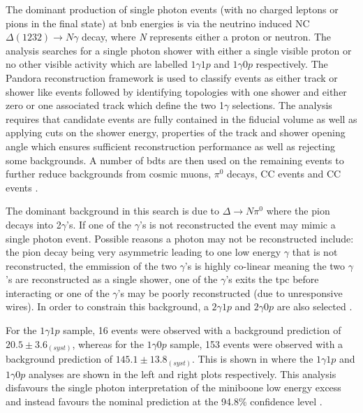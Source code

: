 The dominant production of single photon events (with no charged leptons or pions in the final state) at \gls{bnb} energies is via the neutrino induced NC $\Delta(1232) \rightarrow N\gamma$ decay, where \textit{N} represents either a proton or neutron. The analysis searches for a single photon shower with either a single visible proton or no other visible activity which are labelled $1\gamma1p$ and $1\gamma0p$ respectively. The Pandora reconstruction framework is used to classify events as either track or shower like events followed by identifying topologies with one shower and either zero or one associated track which define the two 1$\gamma$ selections. The analysis requires that candidate events are fully contained in the fiducial volume as well as applying cuts on the shower energy, properties of the track and shower opening angle which ensures sufficient reconstruction performance as well as rejecting some backgrounds. A number of \glspl{bdt} are then used on the remaining events to further reduce backgrounds from cosmic muons, $\pi^0$ decays, \nue CC events and \numu CC events \cite{Search_for_Neutrino_Induced_Neutral_Current_Delta_Radiative_Decay_in_MicroBooNE_and_a_First_Test_of_the_MiniBooNE_Low_Energy_Excess_under_a_Single_Photon_Hypothesis}. 

The dominant background in this search is due to $\Delta \rightarrow N \pi^0$ where the pion decays into 2$\gamma$'s. If one of the $\gamma$'s is not reconstructed the event may mimic a single photon event. Possible reasons a photon may not be reconstructed include: the pion decay being very asymmetric leading to one low energy $\gamma$ that is not reconstructed, the emmission of the two $\gamma$'s is highly co-linear meaning the two $\gamma$'s are reconstructed as a single shower, one of the $\gamma$'s exits the \gls{tpc} before interacting or one of the $\gamma$'s may be poorly reconstructed (due to unresponsive wires). In order to constrain this background, a $2\gamma1p$ and $2\gamma0p$ are also selected \cite{Search_for_Neutrino_Induced_Neutral_Current_Delta_Radiative_Decay_in_MicroBooNE_and_a_First_Test_of_the_MiniBooNE_Low_Energy_Excess_under_a_Single_Photon_Hypothesis}. 

For the $1\gamma1p$ sample, 16 events were observed with a background prediction of $20.5 \pm 3.6_{(syst)}$, whereas for the $1\gamma0p$ sample, 153 events were observed with a background prediction of $145.1 \pm 13.8_{(syst)}$. This is shown in  where the $1\gamma1p$ and $1\gamma0p$ analyses are shown in the left and right plots respectively. This analysis disfavours the single photon interpretation of the \gls{miniboone} low energy excess and instead favours the nominal prediction at the 94.8\% confidence level \cite{Search_for_Neutrino_Induced_Neutral_Current_Delta_Radiative_Decay_in_MicroBooNE_and_a_First_Test_of_the_MiniBooNE_Low_Energy_Excess_under_a_Single_Photon_Hypothesis}. 

